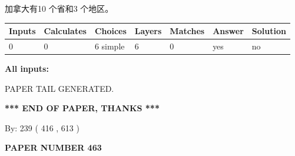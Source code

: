 \documentclass{ctexart}
\begin{document}
 
加拿大有10 个省和3 个地区。
 
 
\noindent{}
 
 
   
   
   
   
\noindent\begin{tabular}{|l|l|l|l|l|l|l|}
 \hline
Inputs & Calculates & Choices & Layers & Matches & Answer & Solution \\ \hline
 0  & 
 0  & 
 6
  simple  
  & 
 6  & 
 0  & 
  yes & 
  no 
  \\ \hline
 \end{tabular}
   
   
   
   
\noindent{}
   
   
   
   
\noindent\vspace{0.1in}\hspace{-0.08in} {\textbf{\Large{All inputs: }}}
   
   
   
   
   
   
 \vspace{0.2in}
 
   
   
\vspace{2.0in} PAPER TAIL GENERATED.
   
   
   
   
\vspace{1.0in} 
{\textbf{\large{ *** END OF PAPER, THANKS *** }}} 
   
   
\hspace{1.0in} By: 
 239 ( 416 ,  613 )
   
   
   
   
\newpage 
\setcounter{page}{ 
   463001 } 
   
   
   
   
 {\textbf{ \Large{ PAPER NUMBER  463  }}}
   
   
\vspace{0.2in}
   
   
   
   
   
   
   
\end{document}
